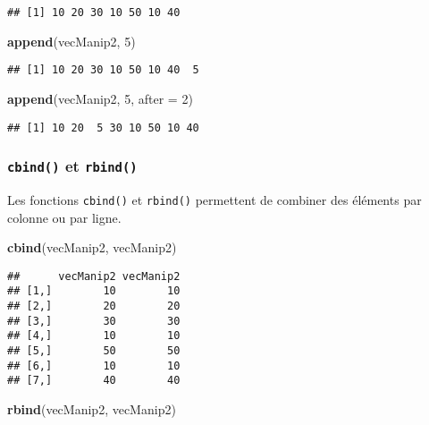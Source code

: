 \documentclass[]{book}
\newenvironment{Shaded}{\begin{snugshade}}{\end{snugshade}}
\newcommand{\KeywordTok}[1]{\textcolor[rgb]{0.13,0.29,0.53}{\textbf{#1}}}
\newcommand{\DataTypeTok}[1]{\textcolor[rgb]{0.13,0.29,0.53}{#1}}
\newcommand{\DecValTok}[1]{\textcolor[rgb]{0.00,0.00,0.81}{#1}}
\newcommand{\NormalTok}[1]{#1}
\theoremstyle{definition}
\theoremstyle{definition}
\theoremstyle{definition}
\theoremstyle{remark}
\begin{document}
\begin{verbatim}
## [1] 10 20 30 10 50 10 40
\end{verbatim}

\begin{Shaded}
\begin{Highlighting}[]
\KeywordTok{append}\NormalTok{(vecManip2, }\DecValTok{5}\NormalTok{)}
\end{Highlighting}
\end{Shaded}

\begin{verbatim}
## [1] 10 20 30 10 50 10 40  5
\end{verbatim}

\begin{Shaded}
\begin{Highlighting}[]
\KeywordTok{append}\NormalTok{(vecManip2, }\DecValTok{5}\NormalTok{, }\DataTypeTok{after =} \DecValTok{2}\NormalTok{)}
\end{Highlighting}
\end{Shaded}

\begin{verbatim}
## [1] 10 20  5 30 10 50 10 40
\end{verbatim}

\subsubsection{\texorpdfstring{\texttt{cbind()} et
\texttt{rbind()}}{cbind() et rbind()}}\label{l015cbind}

Les fonctions \texttt{cbind()} et \texttt{rbind()} permettent de
combiner des éléments par colonne ou par ligne.

\begin{Shaded}
\begin{Highlighting}[]
\KeywordTok{cbind}\NormalTok{(vecManip2, vecManip2)}
\end{Highlighting}
\end{Shaded}

\begin{verbatim}
##      vecManip2 vecManip2
## [1,]        10        10
## [2,]        20        20
## [3,]        30        30
## [4,]        10        10
## [5,]        50        50
## [6,]        10        10
## [7,]        40        40
\end{verbatim}

\begin{Shaded}
\begin{Highlighting}[]
\KeywordTok{rbind}\NormalTok{(vecManip2, vecManip2)}
\end{Highlighting}
\end{Shaded}
\end{document}
